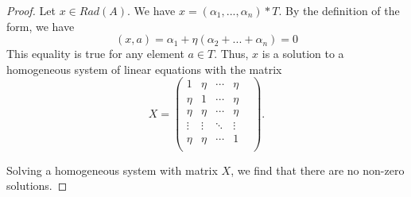 \documentclass[12pt]{article}
\newcommand\al{\alpha}
\begin{document}
\begin{proof}


Let $x\in Rad(A)$. We have $x=(\al_1,...,\al_n)*T$. By the definition of the form, we have $$(x,a)=\al_1+\eta(\al_2+...+\al_n)=0$$
This equality is true for any element $a\in T$. Thus, $x$ is a solution to a homogeneous system of linear equations with the matrix $$X=\begin{pmatrix}

	1    & \eta   &\cdots&\eta \\
	\eta & 1 &\cdots& \eta \\ 
	\eta & \eta &\cdots& \eta\\
	\vdots&\vdots& \ddots & \vdots\\
	\eta & \eta&\cdots& 1&\\
\end{pmatrix}.$$  

Solving a homogeneous system with matrix $X$, we find that there are no non-zero solutions.
\end{proof}
\end{document}

